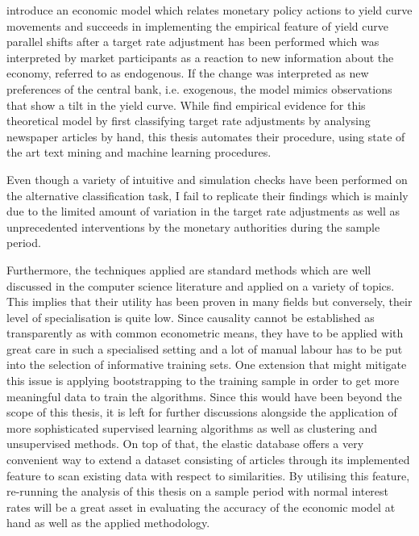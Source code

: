 
\textcite{Ellingsen.2001} introduce an economic model which relates monetary policy actions to yield curve movements and succeeds in implementing the empirical feature of yield curve parallel shifts after a target rate adjustment has been performed which was interpreted by market participants as a reaction to new information about the economy, referred to as endogenous. If the change was interpreted as new preferences of the central bank, i.e. exogenous, the model mimics observations that show a tilt in the yield curve. While \textcite{Ellingsen.2003} find empirical evidence for this theoretical model by first classifying target rate adjustments by analysing newspaper articles by hand, this thesis automates their procedure, using state of the art text mining and machine learning procedures. 

Even though a variety of intuitive and simulation checks have been performed on the alternative classification task, I fail to replicate their findings which is mainly due to the limited amount of variation in the target rate adjustments as well as unprecedented interventions by the monetary authorities during the sample period. 

Furthermore, the techniques applied are standard methods which are well discussed in the computer science literature and applied on a variety of topics. This implies that their utility has been proven in many fields but conversely, their level of specialisation is quite low. Since causality cannot be established as transparently as with common econometric means, they have to be applied with great care in such a specialised setting and a lot of manual labour has to be put into the selection of informative training sets. One extension that might mitigate this issue is applying bootstrapping to the training sample in order to get more meaningful data to train the algorithms. Since this would have been beyond the scope of this thesis, it is left for further discussions alongside the application of more sophisticated supervised learning algorithms as well as clustering and unsupervised methods. On top of that, the elastic database \parencite{Elastic.2015} offers a very convenient way to extend a dataset consisting of articles through its implemented feature to scan existing data with respect to similarities. By utilising this feature, re-running the analysis of this thesis on a sample period with normal interest rates will be a great asset in evaluating the accuracy of the economic model at hand as well as the applied methodology.
